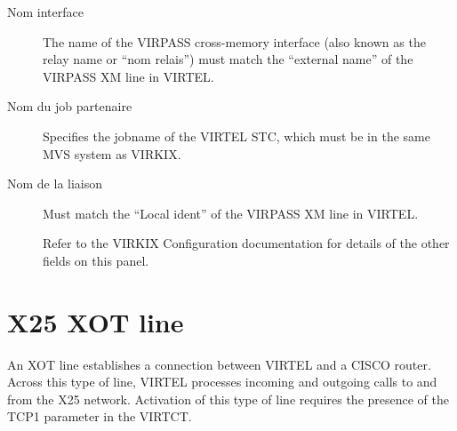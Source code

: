 \documentclass[letterpaper,10pt,english]{sphinxmanual}
\begin{document}
\begin{description}
\item[{Nom interface}] \leavevmode
The name of the VIRPASS cross-memory interface (also known as the
relay name or “nom relais”) must match the “external name” of the
VIRPASS XM line in VIRTEL.

\item[{Nom du job partenaire}] \leavevmode
Specifies the jobname of the VIRTEL STC, which must be in the same
MVS system as VIRKIX.

\item[{Nom de la liaison}] \leavevmode
Must match the “Local ident” of the VIRPASS XM line in VIRTEL.

Refer to the VIRKIX Configuration documentation for details of the
other fields on this panel.

\end{description}

\newpage

\ignorespaces 

\section{X25 XOT line}
\label{\detokenize{connectivity_guide:x25-xot-line}}\label{\detokenize{connectivity_guide:index-51}}
An XOT line establishes a connection between VIRTEL and a CISCO router. Across this type of line, VIRTEL processes incoming and outgoing calls to and from the X25 network. Activation of this type of line requires the presence of the TCP1 parameter in the VIRTCT.


\ignorespaces 
\end{document}
